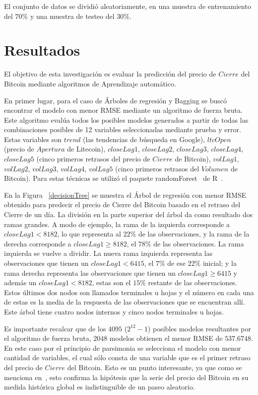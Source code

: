 \documentclass[a4paper,12pt,twocolumn]{article}
\begin{document}
El conjunto de datos se dividió aleatoriamente, en una muestra de entrenamiento del $70\%$ y una muestra de testeo del $30\%$.


\section{Resultados}

El objetivo de  esta investigación es evaluar la predicción del precio de $Cierre$ del Bitcoin mediante algoritmos de Aprendizaje automático. 

En primer lugar, para el caso de Árboles de regresión y Bagging se buscó encontrar el modelo con menor RMSE mediante un algoritmo de fuerza bruta. Este algoritmo evalúa todos los posibles modelos generados a partir de todas las combinaciones posibles de 12 variables seleccionadas mediante prueba y error. Estas variables son $trend$ (las tendencias de búsqueda en Google), $ltcOpen$ (precio de $Apertura$ de Litecoin), $closeLag1$, $closeLag2$, $closeLag3$, $closeLag4$, $closeLag5$ (cinco primeros retrasos del precio de $Cierre$ de Bitcoin), $volLag1$, $volLag2$, $volLag3$, $volLag4$, $volLag5$ (cinco primeros retrasos del $Volumen$ de Bitcoin). Para estas técnicas se utilizó el paquete randomForest~\cite{randomForest} de R~\cite{r}.

En la Figura ~\ref{decisionTree}  se muestra el Árbol de regresión con menor RMSE obtenido para predecir el precio de Cierre del Bitcoin basado en el retraso del Cierre de un día. La división en la parte superior del árbol da como resultado dos ramas grandes. A modo de ejemplo, la rama de la izquierda corresponde a $closeLag1<8182$, lo que representa al $22\%$ de las observaciones, y la rama de la derecha corresponde a $closeLag1 \geq 8182$, el $78\%$ de las observaciones. La rama izquierda se vuelve a dividir. La nueva rama izquierda representa las observaciones que tienen un $closeLag1<6415$, el $7\%$ de ese $22\%$ inicial; y la rama derecha representa las observaciones que tienen un  $closeLag1 \geq 6415$ y además un $closeLag1<8182$, estas son el $15\%$ restante de las observaciones. Estos últimos dos nodos son llamados terminales u hojas y el número en cada una de estas es la media de la respuesta de las observaciones que se encuentran allí. Este árbol tiene cuatro nodos internos y cinco nodos terminales u hojas.

Es importante recalcar que de los $4095$ ($2^{12} - 1$) posibles modelos resultantes por el algoritmo de fuerza bruta, $2048$ modelos obtienen el menor RMSE de $537.6748$. En este caso por el principio de parsimonia se selecciona el modelo con menor cantidad de variables, el cual sólo consta de una variable que es el primer retraso del precio de $Cierre$ del Bitcoin. 
Esto es un punto interesante, ya que como se menciona en~\cite{forecastinBitcoinClosing}, esto confirma la hipótesis que la serie del precio del Bitcoin en su medida histórica global es indistinguible de un paseo aleatorio. 
\end{document}
